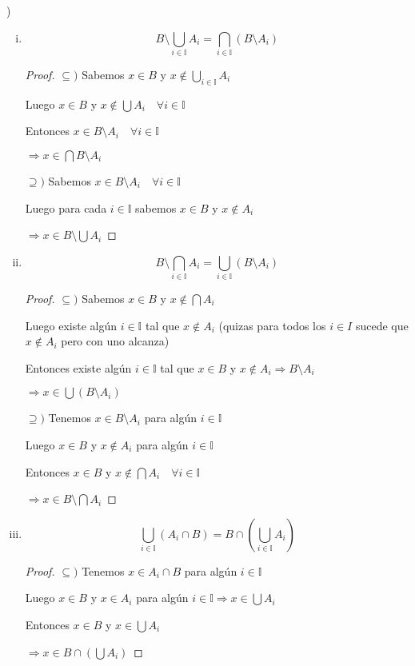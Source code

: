 \documentclass[12pt]{article}
\newcommand{\I}{\mathbb{I}}
\newcommand{\Ra}{\Rightarrow}
\theoremstyle{definition}
\begin{document}
)
\begin{enumerate}[i.]
  \item $$B \setminus \bigcup_{i \in \I} A_{i} = \bigcap_{i \in \I} (B \setminus A_{i})$$
    \begin{proof}
    $\subseteq )$ Sabemos $x \in B $ y $x \notin \bigcup_{i \in \I} A_{i}$ 

    Luego $x \in B$ y $x \notin \bigcup A_{i} \quad \forall i \in \I $

    Entonces $x \in B \setminus A_{i} \quad \forall i \in \I$

    $\Ra x \in \bigcap B \setminus A_{i}$
    
$\supseteq )$ Sabemos $x \in B \setminus A_{i} \quad \forall i \in \I$

Luego para cada $i \in \I$ sabemos $x \in B$ y $x \notin A_{i}$

$\Ra x \in B \setminus \bigcup A_{i}$


  \end{proof}
\item $$B \setminus \bigcap_{i \in \I} A_{i} = \bigcup_{i \in \I} (B \setminus A_{i})$$

  \begin{proof}
  $\subseteq )$ Sabemos $x \in B $ y $x \notin \bigcap A_{i}$ 

    Luego existe algún $i \in \I$ tal que $x \notin A_{i}$ (quizas para todos los $i \in I$ sucede que $x \notin A_{i}$ pero con uno alcanza)

    Entonces existe algún $i \in \I$ tal que $x \in B$ y $x \notin A_{i} \Ra B \setminus A_{i} $

  $\Ra x \in \bigcup (B \setminus A_{i})$

$\supseteq )$ Tenemos $x \in B \setminus A_{i}$ para algún $i \in \I$

Luego $x \in B$ y $x \notin A_{i}$ para algún $i \in \I$

Entonces $x \in B$ y $x \notin \bigcap A_{i} \quad \forall i \in \I$

$\Ra x \in B \setminus \bigcap A_{i}$


  \end{proof}
\item $$\bigcup_{i \in \I} (A_{i} \cap B) = B \cap (\bigcup_{i \in \I} A_{i})$$

  \begin{proof}
  $\subseteq )$ Tenemos $x \in A_{i} \cap B$ para algún $i \in \I$  
  
  Luego $x \in B$ y $x \in A_{i}$ para algún $i \in \I \Ra x \in \bigcup A_{i}$

  Entonces $x \in B$ y $x \in \bigcup A_{i}$

  $\Ra x \in B \cap (\bigcup A_{i})$
\end{proof}

\end{enumerate}
\end{document}
